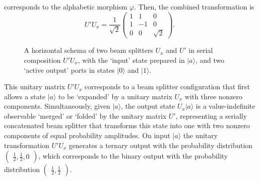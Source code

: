 \documentclass[%
 superscriptaddress,
  preprint,
 showpacs,
 showkeys,
 nofootinbib,
  amsmath,amssymb,
  aps,
 pra,
  longbibliography,
  floatfix,
 ]{revtex4-2}
\theoremstyle{definition}
\begin{document}
\noindent corresponds to the alphabetic morphism $\varphi$.
Then, the combined transformation is
\begin{equation}
U'U_x =
\frac{1}{\sqrt{2}}
\begin{pmatrix}
1&1&0\\
1&-1&0\\
0&0&\sqrt{2}
\end{pmatrix}
.
\label{2023-viext-u}
\end{equation}





\begin{figure}
\begin{center}
\end{center}
                \caption{A horizontal schema of two beam splitters $U_x$ and $U'$ in serial composition $U'U_x$,
with the `input' state prepared in $\vert a\rangle$,
and two `active output' ports in states $\vert 0\rangle$ and $\vert 1\rangle$.}
\label{2023-viext-souubone2}
\end{figure}



This unitary matrix $U'U_x$ corresponds to a beam splitter configuration that first allows a state $\vert a\rangle$ to be `expanded' by a unitary matrix $U_x$ with three nonzero components. Simultaneously,
given $\vert a\rangle$, the output state $U_x\vert a\rangle$ is a value-indefinite observable `merged' or `folded' by the unitary matrix $U'$,
representing a serially concatenated beam splitter that transforms this state
into one with two nonzero components of equal probability amplitudes.
On input $\vert a\rangle $ the unitary transformation  $U'U_x$ generates a ternary output
with the probability distribution
$\begin{pmatrix}\frac{1}{2},\frac{1}{2},0\end{pmatrix}$, which corresponds to the binary output with the probability distribution
$\begin{pmatrix}\frac{1}{2},\frac{1}{2}\end{pmatrix}$.
\end{document}
